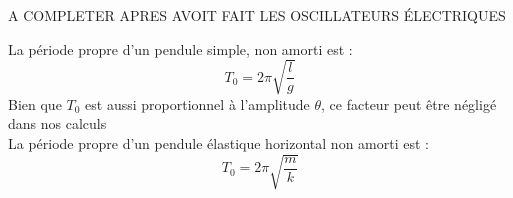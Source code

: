 \begin{Definition}
A COMPLETER APRES AVOIT FAIT LES OSCILLATEURS ÉLECTRIQUES

La période propre d'un pendule simple, non amorti est : 
$$T_{0}=2\pi\sqrt{\dfrac{l}{g}}$$
Bien que $T_{0}$ est aussi proportionnel à l'amplitude $\theta$, ce facteur peut être négligé dans nos calculs\\

La période propre d'un pendule élastique horizontal non amorti est :
$$T_{0}=2\pi\sqrt{\dfrac{m}{k}}$$

\end{Definition}





























